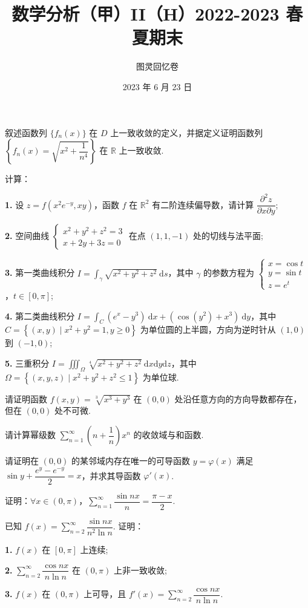 \documentclass[UTF8,14pt,normal]{ctexart}
\title{\textbf{数学分析（甲）II（H）2022-2023 春夏期末}}
\author{图灵回忆卷}
\date{2023 年 6 月 23 日}
\begin{document}
\maketitle

 叙述函数列 $\{f_n(x)\}$ 在 $ D $ 上一致收敛的定义，并据定义证明函数列 $ \left\{f_n(x) = \sqrt{x^2 + \dfrac{1}{n^4}}\right\} $ 在 $ \mathbb{R} $ 上一致收敛.

 计算：

\textbf{1.} 设 $ z = f(x^2e^{-y}, xy) $，函数 $ f $ 在 $ \mathbb{R}^2 $ 有二阶连续偏导数，请计算 $ \dfrac{\partial^2z}{\partial x\partial y} $;

\textbf{2.} 空间曲线 $ \begin{cases} x^2 + y^2 + z^2 = 3 \\ x + 2y + 3z = 0 \end{cases} $ 在点 $ (1, 1, -1) $ 处的切线与法平面; \vspace{-1em}

\textbf{3.} 第一类曲线积分 $ I = \displaystyle\int_\gamma\sqrt{x^2 + y^2 + z^2}\ \mathrm ds $，其中 $ \gamma $ 的参数方程为 $ \begin{cases} x = \cos t \\ y = \sin t \\ z = e^t \end{cases} $，$ t \in [0, \pi] $;

\textbf{4.} 第二类曲线积分 $ I = \displaystyle\int_C (e^x - y^3)\ \mathrm dx + \left(\cos(y^2) + x^3\right)\ \mathrm dy $，其中 $ C = \left\{ (x, y) \mid x^2 + y^2 = 1, y \ge 0 \right\} $ 为单位圆的上半圆，方向为逆时针从 $ (1, 0) $ 到 $ (-1, 0) $;

\textbf{5.} 三重积分 $ I = \displaystyle\iiint_\Omega \sqrt[4]{x^2 + y^2 + z^2}\ \mathrm dx \mathrm dy \mathrm dz $，其中 $ \Omega = \left\{ (x, y, z) \mid x^2 + y^2 + z^2 \le 1 \right\} $ 为单位球.

 请证明函数 $ f(x, y) = \sqrt[3]{x^3 + y^3} $ 在 $ (0, 0) $ 处沿任意方向的方向导数都存在，但在 $ (0, 0) $ 处不可微.

 请计算幂级数 $ \displaystyle\sum_{n=1}^\infty \left(n + \dfrac{1}{n}\right) x^n $ 的收敛域与和函数.

 请证明在 $ (0, 0) $ 的某邻域内存在唯一的可导函数 $ y = \varphi(x) $ 满足 $ \sin y + \dfrac{e^y - e^{-y}}{2} = x $，并求其导函数 $ \varphi'(x) $.

 证明：$ \forall x \in (0, \pi) $，$ \displaystyle\sum_{n=1}^\infty \dfrac{\sin nx}{n} = \dfrac{\pi - x}{2} $.

 已知 $ f(x) = \displaystyle\sum_{n=2}^\infty \dfrac{\sin nx}{n^2 \ln n} $. 证明：

\textbf{1.} $ f(x) $ 在 $ [0, \pi] $ 上连续;

\textbf{2.} $ \displaystyle\sum_{n=2}^\infty \dfrac{\cos nx}{n \ln n} $ 在 $ (0, \pi) $ 上非一致收敛;

\textbf{3.} $ f(x) $ 在 $ (0, \pi) $ 上可导，且 $ f'(x) = \displaystyle\sum_{n=2}^\infty \dfrac{\cos nx}{n \ln n} $.
\end{document}
